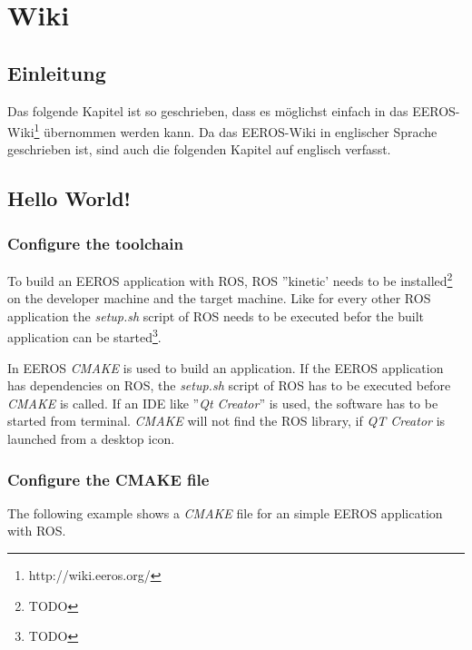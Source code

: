 \chapter{Wiki}
\section{Einleitung}
Das folgende Kapitel ist so geschrieben, dass es möglichst einfach in das EEROS-Wiki\footnote{http://wiki.eeros.org/} übernommen werden kann.
Da das EEROS-Wiki in englischer Sprache geschrieben ist, sind auch die folgenden Kapitel auf englisch verfasst.


\section{Hello World!}

\subsection{Configure the toolchain}										%
To build an EEROS application with ROS, ROS ''kinetic' needs to be installed\footnote{TODO} on the developer machine and the target machine.
Like for every other ROS application the \textit{setup.sh} script of ROS needs to be executed befor the built application can be started\footnote{TODO}.%

In EEROS \textit{CMAKE} is used to build an application.
If the EEROS application has dependencies on ROS, the \textit{setup.sh} script of ROS has to be executed before \textit{CMAKE} is called.
If an IDE like ''\textit{Qt Creator}'' is used, the software has to be started from terminal.
\textit{CMAKE} will not find the ROS library, if \textit{QT Creator} is launched from a desktop icon.

\subsection{Configure the CMAKE file}
The following example shows a \textit{CMAKE} file for an simple EEROS application with ROS.

